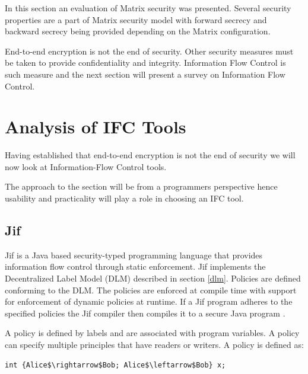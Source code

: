 In this section an evaluation of Matrix security was presented. Several security properties are a part of Matrix security model with forward secrecy and backward secrecy being provided depending on the Matrix configuration.

End-to-end encryption is not the end of security. Other security measures must be taken to provide confidentiality and integrity. Information Flow Control is such measure and the next section will present a survey on Information Flow Control.


\newpage
\section{Analysis of IFC Tools}



Having established that end-to-end encryption is not the end of security we will now look at Information-Flow Control tools. 

The approach to the section will be from a programmers perspective hence usability and practicality will play a role in choosing an IFC tool. 

\subsection{Jif}

Jif is a Java based security-typed programming language that provides information flow control through static enforcement. Jif implements the Decentralized Label Model (DLM) described in section \ref{dlm}. Policies are defined conforming to the DLM. The policies are enforced at compile time with support for enforcement of dynamic policies at runtime. If a Jif program adheres to the specified policies the Jif compiler then compiles it to a secure Java program \cite{jifmanual}. 

A policy is defined by labels and are associated with program variables. A policy can specify multiple principles that have readers or writers. A policy is defined as: 

\begin{lstlisting}[mathescape]
int {Alice$\rightarrow$Bob; Alice$\leftarrow$Bob} x;
\end{lstlisting}

